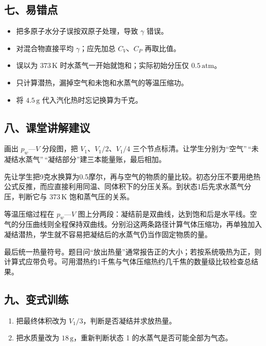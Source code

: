 \documentclass[12pt,a4paper,UTF8]{ctexart}
\newcommand{\tightlist}{\setlength{\itemsep}{0pt}\setlength{\parskip}{0pt}}
\begin{document}
\subsection{七、易错点}\label{ux4e03ux6613ux9519ux70b9-5}

\begin{itemize}
\tightlist
\item
  把多原子水分子误按双原子处理，导致 \(\gamma\) 错误。
\item
  对混合物直接平均 \(\gamma\)；应先加总 \(C_V\)、\(C_P\) 再取比值。
\item
  误以为 \(373\,\mathrm K\) 时水蒸气一开始就饱和；实际初始分压仅
  \(0.5\,\mathrm{atm}\)。
\item
  只计算潜热，漏掉空气和未饱和水蒸气的等温压缩功。
\item
  将 \(4.5\,\mathrm g\) 代入汽化热时忘记换算为千克。
\end{itemize}

\subsection{八、课堂讲解建议}\label{ux516bux8bfeux5802ux8bb2ux89e3ux5efaux8bae-5}

画出 \(p_w\)---\(V\) 分段图，把 \(V_1\)、\(V_1/2\)、\(V_1/4\)
三个节点标清。让学生分别为``空气''\,``未凝结水蒸气''\,``凝结部分''建三本能量账，最后相加。

先让学生把9克水换算为0.5摩尔，再与空气的物质的量比较。初态分压不要用绝热公式反推，而应直接利用同温、同体积下的分压关系。到状态1后先求水蒸气分压，判断它与
\(373\,\mathrm K\) 饱和蒸气压的关系。

等温压缩过程在 \(p_w\)---\(V\)
图上分两段：凝结前是双曲线，达到饱和后是水平线。空气的分压曲线则全程保持双曲线。分别沿这两条路径计算气体压缩功，再单独加入凝结潜热，学生就不容易把凝结后的水蒸气仍当作固定物质的量。

最后统一热量符号。题目问``放出热量''通常报告正的大小；若按系统吸热为正，则计算式应带负号。可用潜热约1千焦与气体压缩热约几千焦的数量级比较检查总结果。

\subsection{九、变式训练}\label{ux4e5dux53d8ux5f0fux8badux7ec3-5}

\begin{enumerate}
\def\labelenumi{\arabic{enumi}.}
\tightlist
\item
  把最终体积改为 \(V_1/3\)，判断是否凝结并求放热量。
\item
  把水质量改为 \(18\,\mathrm g\)，重新判断状态 1
  的水蒸气是否可能全部为气态。
\end{enumerate}
\end{document}
